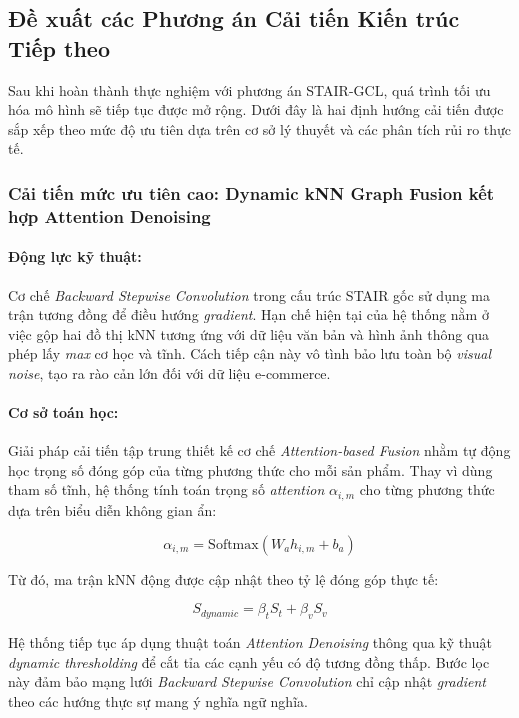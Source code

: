 \begin{longtable}
\subsection{Đề xuất các Phương án Cải tiến Kiến trúc Tiếp theo}

Sau khi hoàn thành thực nghiệm với phương án STAIR-GCL, quá trình tối ưu hóa mô hình sẽ tiếp tục được mở rộng. Dưới đây là hai định hướng cải tiến được sắp xếp theo mức độ ưu tiên dựa trên cơ sở lý thuyết và các phân tích rủi ro thực tế.

\subsubsection{Cải tiến mức ưu tiên cao: Dynamic kNN Graph Fusion kết hợp Attention Denoising}

\paragraph{Động lực kỹ thuật:}
Cơ chế \textit{Backward Stepwise Convolution} trong cấu trúc STAIR gốc sử dụng ma trận tương đồng để điều hướng \textit{gradient}. Hạn chế hiện tại của hệ thống nằm ở việc gộp hai đồ thị kNN tương ứng với dữ liệu văn bản và hình ảnh thông qua phép lấy \textit{max} cơ học và tĩnh. Cách tiếp cận này vô tình bảo lưu toàn bộ \textit{visual noise}, tạo ra rào cản lớn đối với dữ liệu e-commerce.

\paragraph{Cơ sở toán học:}
Giải pháp cải tiến tập trung thiết kế cơ chế \textit{Attention-based Fusion} nhằm tự động học trọng số đóng góp của từng phương thức cho mỗi sản phẩm. Thay vì dùng tham số tĩnh, hệ thống tính toán trọng số \textit{attention} $\alpha_{i,m}$ cho từng phương thức dựa trên biểu diễn không gian ẩn:

\begin{equation}
\alpha_{i,m} = \text{Softmax}(W_a h_{i,m} + b_a)
\end{equation}

Từ đó, ma trận kNN động được cập nhật theo tỷ lệ đóng góp thực tế:

\begin{equation}
S_{dynamic} = \beta_t S_t + \beta_v S_v
\end{equation}

Hệ thống tiếp tục áp dụng thuật toán \textit{Attention Denoising} thông qua kỹ thuật \textit{dynamic thresholding} để cắt tỉa các cạnh yếu có độ tương đồng thấp. Bước lọc này đảm bảo mạng lưới \textit{Backward Stepwise Convolution} chỉ cập nhật \textit{gradient} theo các hướng thực sự mang ý nghĩa ngữ nghĩa.


\end{longtable}
